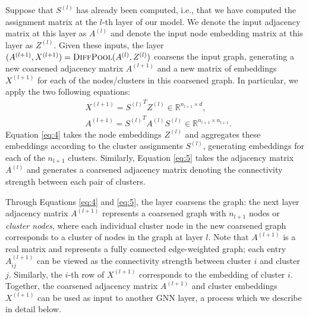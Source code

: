 Suppose that $S^{(l)}$ has already been computed, i.e., that we have computed the assignment matrix at the $l$-th layer of our model.
We denote the input adjacency matrix at this layer as $A^{(l)}$ and denote the input node embedding matrix at this layer as $Z^{(l)}$.
Given these inputs, the \name layer $(A^{(l+1)},X^{(l+1)}) = \textsc{DiffPool}(A^{(l)},Z^{(l)})$ coarsens the input graph, generating a new coarsened adjacency matrix $A^{(l+1)}$ and a new matrix of embeddings $X^{(l+1)}$ for each of the nodes/clusters in this coarsened graph.
In particular, we apply the two following equations:
\begin{align}
\label{eq:4}
&X^{(l+1)} = {S^{(l)}}^T Z^{(l)}\in \mathbb{R}^{n_{l+1} \times d},\\
\label{eq:5}
&A^{(l+1)} = {S^{(l)}}^T A^{(l)}{S^{(l)}} \in \mathbb{R}^{n_{l+1} \times n_{l+1}}.
\end{align}
Equation \eqref{eq:4} takes the node embeddings $Z^{(l)}$ and aggregates these embeddings according to the cluster assignments $S^{(l)}$, generating embeddings for each of the $n_{l+1}$ clusters.
Similarly, Equation \eqref{eq:5} takes the adjacency matrix $A^{(l)}$ and generates a coarsened adjacency matrix denoting the connectivity strength between each pair of clusters. 

Through Equations \eqref{eq:4} and \eqref{eq:5}, the \name layer coarsens the graph: the next layer adjacency matrix $A^{(l+1)}$ represents a coarsened graph with $n_{l+1}$ nodes or {\em cluster nodes}, where each individual cluster node in the new coarsened graph corresponds to a cluster of nodes in the graph at layer $l$.
Note that $A^{(l+1)}$ is a real matrix and represents a fully connected edge-weighted  graph; each entry $A^{(l+1)}_{ij}$ can be viewed as the connectivity strength between cluster $i$ and cluster $j$. 
Similarly, the $i$-th row of $X^{(l+1)}$ corresponds to the embedding of cluster $i$. 
Together, the coarsened adjacency matrix $A^{(l+1)}$ and cluster embeddings $X^{(l+1)}$ can be used as input to another GNN layer, a process which we describe in detail below.  

